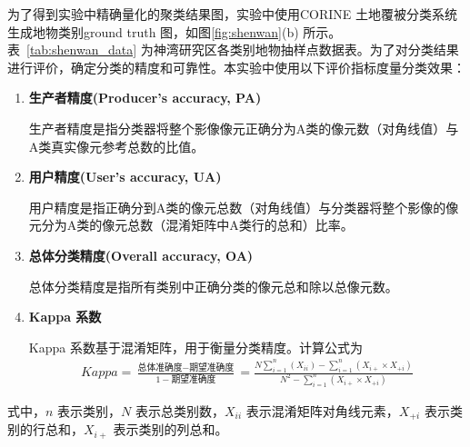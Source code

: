 为了得到实验中精确量化的聚类结果图，实验中使用CORINE 土地覆被分类系统生成地物类别ground truth 图，如图\ref{fig:shenwan}(b) 所示。表~\ref{tab:shenwan_data} 为神湾研究区各类别地物抽样点数据表。为了对分类结果进行评价，确定分类的精度和可靠性。本实验中使用以下评价指标度量分类效果：
\begin{enumerate}
    \item \textbf{生产者精度(Producer's accuracy, PA)}

          生产者精度是指分类器将整个影像像元正确分为A类的像元数（对角线值）与A类真实像元参考总数的比值。
    \item \textbf{用户精度(User's accuracy, UA)}

          用户精度是指正确分到A类的像元总数（对角线值）与分类器将整个影像的像元分为A类的像元总数（混淆矩阵中A类行的总和）比率。
    \item \textbf{总体分类精度(Overall accuracy, OA)}

          总体分类精度是指所有类别中正确分类的像元总和除以总像元数。
    \item \textbf{Kappa 系数}

          Kappa 系数基于混淆矩阵，用于衡量分类精度。计算公式为
          \begin{equation}\label{eq:kappa}
              \begin{split}
                  Kappa = \frac{\mbox{总体准确度}-\mbox{期望准确度}}{1-\mbox{期望准确度}} = \frac{N\sum_{i=1}^n(X_{ii}) - \sum_{i=1}^n(X_{i+} \times X_{+i})}{N^2 - \sum_{i=1}^n(X_{i+} \times X_{+i})}
              \end{split}
          \end{equation}
\end{enumerate}
式中，$n$ 表示类别，$N$ 表示总类别数，$X_{ii}$ 表示混淆矩阵对角线元素，$X_{+i}$ 表示类别的行总和，$X_{i+}$ 表示类别的列总和。

